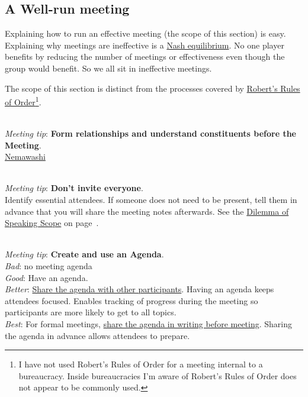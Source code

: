 \subsection*{A Well-run meeting\label{sec:well-run-meeting}}

Explaining how to run an effective meeting (the scope of this section) is easy. Explaining why meetings are ineffective is a \href{https://en.wikipedia.org/wiki/Nash_equilibrium}{Nash equilibrium}. No one player benefits by reducing the number of meetings or effectiveness even though the group would benefit. So we all sit in ineffective meetings. 

The scope of this section is distinct from the processes covered by \href{https://en.wikipedia.org/wiki/Robert\%27s_Rules_of_Order}{Robert's Rules of Order}\footnote{I have not used Robert's Rules of Order for a meeting internal to a bureaucracy. Inside bureaucracies I'm aware of Robert's Rules of Order does not appear to be commonly used.}. 


\ \\
\textit{Meeting tip}: \textbf{Form relationships and understand constituents before the Meeting}.\\

\href{https://en.wikipedia.org/wiki/Nemawashi}{Nemawashi}

\ \\
\textit{Meeting tip}: \textbf{Don't invite everyone}.\\
Identify essential attendees. If someone does not need to be present, tell them in advance that you will share the meeting notes afterwards. See the \href{table:scope-of-speaking}{Dilemma of Speaking Scope} on page~\pageref{table:scope-of-speaking}.

\ \\
\textit{Meeting tip}: \textbf{Create and use an Agenda}.\\
\textit{Bad}: no meeting agenda\\
\textit{Good}: Have an agenda. \\
\textit{Better}: \underline{Share the agenda with other participants}. Having an agenda keeps attendees focused.  Enables tracking of progress during the meeting so participants are more likely to get to all topics.\\
\textit{Best}: For formal meetings, \underline{share the agenda in writing before meeting}. Sharing the agenda in advance allows attendees to prepare.

